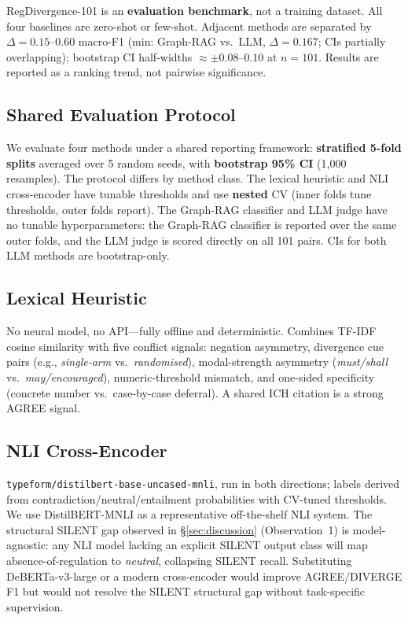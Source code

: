 \documentclass[manuscript]{acmart}
\begin{document}
\begin{revblock}
RegDivergence-101 is an \textbf{evaluation benchmark}, not a training dataset.
All four baselines are zero-shot or few-shot. Adjacent methods are separated by
$\Delta = 0.15$--$0.60$ macro-F1 (min: Graph-RAG vs.\ LLM, $\Delta = 0.167$;
CIs partially overlapping); bootstrap CI half-widths $\approx \pm 0.08$--$0.10$
at $n = 101$. Results are reported as a ranking trend, not pairwise significance.
\end{revblock}

\subsection{Shared Evaluation Protocol}

We evaluate four methods under a shared reporting framework:
\textbf{stratified 5-fold splits} averaged over 5 random seeds, with
\textbf{bootstrap 95\% CI} (1{,}000 resamples). The protocol differs by
method class. The lexical heuristic and NLI cross-encoder have tunable
thresholds and use \textbf{nested} CV (inner folds tune thresholds, outer folds
report). The Graph-RAG classifier and LLM judge have no tunable
hyperparameters: the Graph-RAG classifier is reported over the same outer
folds, and the LLM judge is scored directly on all 101 pairs. CIs for both LLM
methods are bootstrap-only.

\subsection{Lexical Heuristic}

No neural model, no API---fully offline and deterministic. Combines TF-IDF
cosine similarity with five conflict signals: negation asymmetry, divergence
cue pairs (e.g., \textit{single-arm} vs.\ \textit{randomised}), modal-strength
asymmetry (\textit{must/shall} vs.\ \textit{may/encouraged}),
numeric-threshold mismatch, and one-sided specificity (concrete number
vs.\ case-by-case deferral). A shared ICH citation is a strong AGREE signal.

\subsection{NLI Cross-Encoder}

\texttt{typeform/distilbert-base-uncased-mnli}, run in both directions; labels
derived from contradiction/neutral/entailment probabilities with CV-tuned
thresholds. We use DistilBERT-MNLI as a representative off-the-shelf NLI
system. The structural SILENT gap observed in \S\ref{sec:discussion} (Observation~1)
is model-agnostic: any NLI model lacking an explicit SILENT output class will
map absence-of-regulation to \textit{neutral}, collapsing SILENT recall.
Substituting DeBERTa-v3-large or a modern cross-encoder would improve
AGREE/DIVERGE F1 but would not resolve the SILENT structural gap without
task-specific supervision.
\end{document}
